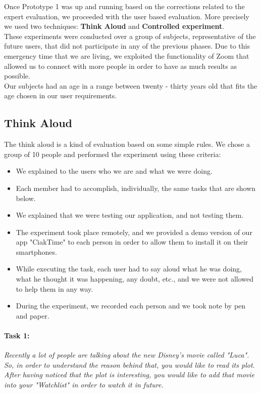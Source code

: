 \documentclass[12pt, a4paper]{article}
\numberwithin{figure}{section}
\begin{document}
Once Prototype 1 was up and running based on the corrections related to the expert evaluation, we 
proceeded with the user based evaluation. More precisely we used two techniques: \textbf{Think Aloud} and 
\textbf{Controlled experiment}.\\ These experiments were conducted over a group of subjects, representative 
of the future users, that did not participate in any of the previous phases.
Due to this emergency time that we are living, we exploited the functionality of Zoom that allowed us 
to connect with more people in order to have as much results as possible.\\
Our subjects had an age in a range between twenty - thirty years old that fits the age chosen in our user requirements.

\subsection{Think Aloud}

The think aloud is a kind of evaluation based on some simple rules. We chose a group of 10 people and 
performed the experiment using these criteria:
\begin{itemize}
	\item We explained to the users who we are and what we were doing.
	\item Each member had to accomplish, individually, the same tasks that are shown below.
	\item We explained that we were testing our application, and not testing them.
	\item The experiment took place remotely, and we provided a demo version of our app "CiakTime" to each person in order to allow them to install it on their smartphones.
	\item While executing the task, each user had to say aloud what he was doing, what he thought it was happening, any doubt, etc., and we were not allowed to help them in any way.
	\item During the experiment, we recorded each person and we took note by pen and paper.
\end{itemize}

\paragraph{Task 1:} \textit{Recently a lot of people are talking about the new Disney's movie called "Luca". So,  
in order to understand the reason behind that, you would like to read its plot. After having noticed that the plot is 
interesting, you would like to add that movie into your "Watchlist" in order to watch it in future.}
\end{document}
